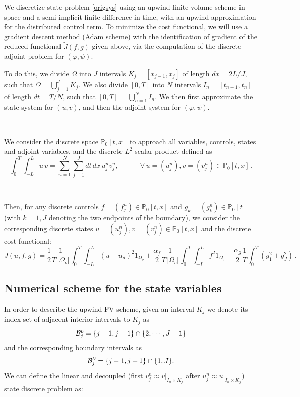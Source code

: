 \documentclass[11pt]{article}
\numberwithin{theorem}{section}
\begin{document}

 
 We discretize state problem \eqref{origsys}  using an upwind finite volume scheme in space and a semi-implicit finite difference in time, with an upwind approximation for the distributed control term. To minimize the cost functional, we will use a gradient descent method (Adam  scheme) with the identification of gradient of the reduced functional $\widetilde J (f,g)$ given above, via the computation of the discrete adjoint problem for $(\varphi, \psi)$.


 To do this, we divide $\overline\Omega$ into $J$ intervals $K_j=[x_{j-1},x_j]$ of length $dx=2L/J$, such that $\overline\Omega=\bigcup_{j=1}^J K_j$. 
 We also divide $[0,T]$ into $N$ intervals $I_n=[t_{n-1},t_n]$ of length $dt=T/N$, such that $[0,T]=\bigcup_{n=1}^N I_n$. 
We then first approximate the state system for $(u,v)$, and then the adjoint system for $(\varphi,\psi)$. 

\

We consider the discrete space $\mathbb{P}_0[t,x]$ to approach all variables, controls, states and adjoint variables, and the discrete $L^2$ scalar product defined as
$$
\int_0^T\!\!\int_{-L} ^L u\, v=\sum_{n=1}^N\sum_{j=1}^J dt\, dx\, u_j^n v_j^n,
\quad\quad\quad
\forall\, u=(u_j^n),v=(v_j^n)\in\mathbb{P}_0[t,x]\,.
$$

\

Then, for any discrete controls $f=(f_j^n)\in\mathbb{P}_0[t,x]$ and $g_k=(g_k^n)\in\mathbb{P}_0[t]$ (with $k=1,J$ denoting the two endpoints of the boundary), we consider the corresponding discrete states $u=(u_j^n),v=(v_j^n)\in\mathbb{P}_0[t,x]$ and  the discrete cost functional:
$$
    J(u,f,g)=\frac{1}{2} \frac{1}{T\, |\Omega_o|}\int_0^T\!\!\int_{-L}^L (u-u_d)^2 1_{\Omega_o}  
    +\frac{\alpha_f}{2} \frac{1}{T\, |\Omega_c|} \int_0^T  \!\!\int_{-L}^L f^2  1_{\Omega_c}
    +\frac{\alpha_g}{2} \frac{1}{T} \int_0^T (g_1^2+g_J^2)\,. 
$$


\subsection{Numerical scheme for the state variables}

In order to describe the upwind FV scheme, given an interval $K_j$ we denote its index set of adjacent interior intervals to $K_j$ as 
$${\cal B}_j^o=\{ j-1,j+1\}\cap \{ 2,\cdots, J-1\}$$
and the corresponding boundary intervals as 
$${\cal B}_j^\partial=\{ j-1,j+1\}\cap \{ 1,J\}.$$
We can define the linear and decoupled (first $v^n_j\approx v|_{I_n\times K_j}$ after $u^n_j\approx u|_{I_n\times K_j}$) state discrete problem as:
\end{document}
